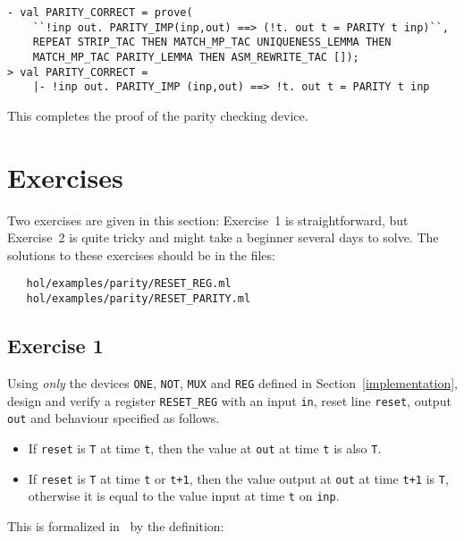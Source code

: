 \begin{session}
\begin{verbatim}
- val PARITY_CORRECT = prove(
    ``!inp out. PARITY_IMP(inp,out) ==> (!t. out t = PARITY t inp)``,
    REPEAT STRIP_TAC THEN MATCH_MP_TAC UNIQUENESS_LEMMA THEN
    MATCH_MP_TAC PARITY_LEMMA THEN ASM_REWRITE_TAC []);
> val PARITY_CORRECT =
    |- !inp out. PARITY_IMP (inp,out) ==> !t. out t = PARITY t inp
\end{verbatim}
\end{session}

\noindent This completes the proof of the
parity checking device.

\section{Exercises}
\label{exercises}

Two exercises are given in this section: Exercise~1 is
straightforward, but Exercise~2 is quite tricky and might take a
beginner several days to solve. The solutions to these exercises
should be in the files:

\begin{hol}\begin{verbatim}
   hol/examples/parity/RESET_REG.ml
   hol/examples/parity/RESET_PARITY.ml
\end{verbatim}\end{hol}


\subsection{Exercise 1}

Using {\it only\/} the devices {\small\verb|ONE|}, {\small\verb|NOT|},
{\small\verb|MUX|} and {\small\verb|REG|} defined in Section~\ref{implementation},
design and verify a register {\small\verb|RESET_REG|}
with an input {\small\verb|in|}, reset line {\small\verb|reset|},
output {\small\verb|out|} and behaviour specified as follows.
\begin{itemize}
\item If {\small\verb|reset|} is {\small\verb|T|} at time {\small\verb|t|},
then the value at {\small\verb|out|} at time {\small\verb|t|} is also
{\small\verb|T|}.
\item If {\small\verb|reset|} is {\small\verb|T|} at time {\small\verb|t|} or
{\small\verb|t+1|},
then the value output at {\small\verb|out|} at time {\small\verb|t+1|} is
{\small\verb|T|}, otherwise it is equal to
the value input at time {\small\verb|t|} on {\small\verb|inp|}.
\end{itemize}
This is formalized in \HOL\ by the definition:

